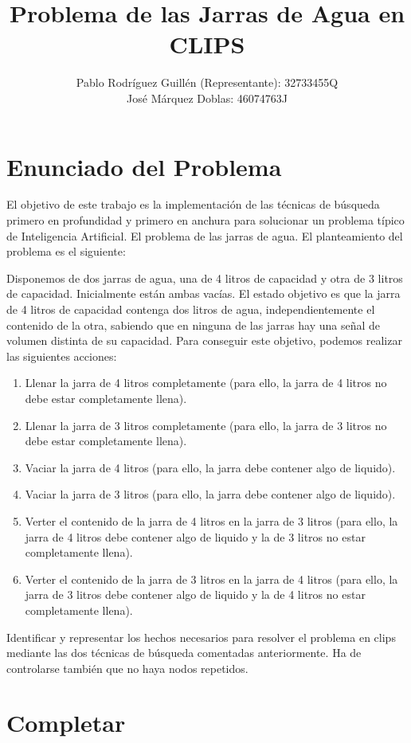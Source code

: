 \documentclass[12pt,a4paper,final]{article}
\author{Pablo Rodríguez Guillén (Representante): 32733455Q \\
		José Márquez Doblas: 46074763J}
\title{\textbf{Problema de las Jarras de Agua en CLIPS}}
\begin{document}
\maketitle
\tableofcontents
\newpage

\section{Enunciado del Problema}
El objetivo de este trabajo es la implementación de las técnicas de búsqueda primero en profundidad y primero en anchura para solucionar un problema típico de Inteligencia Artificial. El problema de las jarras de agua. El planteamiento del problema es el siguiente:

Disponemos de dos jarras de agua, una de 4 litros de capacidad y otra de 3 litros de capacidad. Inicialmente están ambas vacías. El estado objetivo es que la jarra de 4 litros de capacidad contenga dos litros de agua, independientemente el contenido de la otra, sabiendo que en ninguna de las jarras hay una señal de volumen distinta de su capacidad. Para conseguir este objetivo, podemos realizar las siguientes acciones:

\begin{enumerate}
	\item Llenar la jarra de 4 litros completamente (para ello, la jarra de 4 litros no debe estar completamente llena).
	\item Llenar la jarra de 3 litros completamente (para ello, la jarra de 3 litros no debe estar completamente llena).
	\item Vaciar la jarra de 4 litros (para ello, la jarra debe contener algo de liquido).
	\item Vaciar la jarra de 3 litros (para ello, la jarra debe contener algo de liquido).
	\item Verter el contenido de la jarra de 4 litros en la jarra de 3 litros (para ello, la jarra de 4 litros debe contener algo de liquido y la de 3 litros no estar completamente llena).
	\item Verter el contenido de la jarra de 3 litros en la jarra de 4 litros (para ello, la jarra de 3 litros debe contener algo de liquido y la de 4 litros no estar completamente llena).
\end{enumerate}

Identificar y representar los hechos necesarios para resolver el problema en clips mediante las dos técnicas de búsqueda comentadas anteriormente. Ha de controlarse también que no haya nodos repetidos.

\section{Completar}
\end{document}
